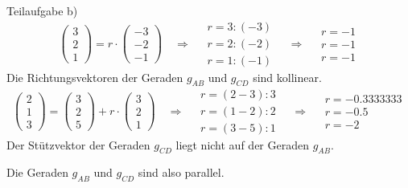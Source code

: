 \begin{exercise}
    Teilaufgabe b)
    \begin{equation*}
    \begin{pmatrix}
      \num{3} \\
      \num{2} \\
      \num{1}
    \end{pmatrix}
    =r\cdot
    \begin{pmatrix}
      -\num{3} \\
      -\num{2} \\
      -\num{1}
    \end{pmatrix}
    \quad\Rightarrow\quad
    \begin{array}{l}
      r=\num{3}:\left(-\num{3}\right) \\
      r=\num{2}:\left(-\num{2}\right) \\
      r=\num{1}:\left(-\num{1}\right)
    \end{array}
    \quad\Rightarrow\quad
    \begin{array}{l}
      r=-\num{1} \\
      r=-\num{1} \\
      r=-\num{1}
    \end{array}
    \end{equation*}
    Die Richtungsvektoren der Geraden $g_{AB}$ und $g_{CD}$ sind kollinear.
    \begin{equation*}
    \begin{pmatrix}
      \num{2} \\
      \num{1} \\
      \num{3}
    \end{pmatrix}
    =
    \begin{pmatrix}
      \num{3} \\
      \num{2} \\
      \num{5}
    \end{pmatrix}
    +r\cdot
    \begin{pmatrix}
      \num{3} \\
      \num{2} \\
      \num{1}
    \end{pmatrix}
    \quad\Rightarrow\quad
    \begin{array}{l}
      r=\left(\num{2}-\num{3}\right):\num{3} \\
      r=\left(\num{1}-\num{2}\right):\num{2} \\
      r=\left(\num{3}-\num{5}\right):\num{1}
    \end{array}
    \quad\Rightarrow\quad
    \begin{array}{l}
      r=-\num{0.3333333} \\
      r=-\num{0.5} \\
      r=-\num{2}
    \end{array}
    \end{equation*}
    Der Stützvektor der Geraden $g_{CD}$ liegt nicht auf der Geraden $g_{AB}$.
    \par
    Die Geraden $g_{AB}$ und $g_{CD}$ sind also parallel.


\end{exercise}
